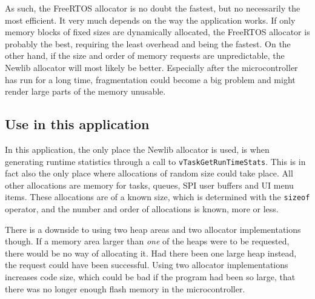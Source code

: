 As such, the FreeRTOS allocator is no doubt the fastest, but no necessarily the most efficient. It very much depends on the way the application works. If only memory blocks of fixed sizes are dynamically allocated, the FreeRTOS allocator is probably the best, requiring the least overhead and being the fastest. On the other hand, if the size and order of memory requests are unpredictable, the Newlib allocator will most likely be better. Especially after the microcontroller has run for a long time, fragmentation could become a big problem and might render large parts of the memory unusable.


\subsection{Use in this application}

In this application, the only place the Newlib allocator is used, is when generating runtime statistics through a call to \texttt{vTaskGetRunTimeStats}. This is in fact also the only place where allocations of random size could take place. All other allocations are memory for tasks, queues, SPI user buffers and UI menu items. These allocations are of a known size, which is determined with the \texttt{sizeof} operator, and the number and order of allocations is known, more or less.

There is a downside to using two heap areas and two allocator implementations though. If a memory area larger than \textit{one} of the heaps were to be requested, there would be no way of allocating it. Had there been one large heap instead, the request could have been successful. Using two allocator implementations increases code size, which could be bad if the program had been so large, that there was no longer enough flash memory in the microcontroller.

